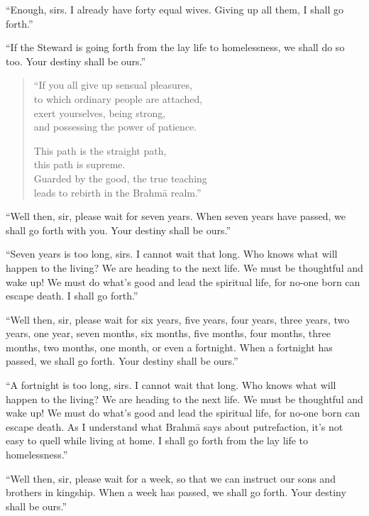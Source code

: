 \documentclass[12pt,openany]{book}%
\begin{document}
“Enough, sirs. I already have forty equal wives. Giving up all them, I shall go forth.” 

“If the Steward is going forth from the lay life to homelessness, we shall do so too. Your destiny shall be ours.” 

\begin{verse}%
“If you all give up sensual pleasures, \\
to which ordinary people are attached, \\
exert yourselves, being strong, \\
and possessing the power of patience. 

This path is the straight path, \\
this path is supreme. \\
Guarded by the good, the true teaching \\
leads to rebirth in the \textsanskrit{Brahmā} realm.” 

%
\end{verse}

“Well then, sir, please wait for seven years. When seven years have passed, we shall go forth with you. Your destiny shall be ours.” 

“Seven years is too long, sirs. I cannot wait that long. Who knows what will happen to the living? We are heading to the next life. We must be thoughtful and wake up! We must do what’s good and lead the spiritual life, for no-one born can escape death. I shall go forth.” 

“Well then, sir, please wait for six years, five years, four years, three years, two years, one year, seven months, six months, five months, four months, three months, two months, one month, or even a fortnight. When a fortnight has passed, we shall go forth. Your destiny shall be ours.” 

“A fortnight is too long, sirs. I cannot wait that long. Who knows what will happen to the living? We are heading to the next life. We must be thoughtful and wake up! We must do what’s good and lead the spiritual life, for no-one born can escape death. As I understand what \textsanskrit{Brahmā} says about putrefaction, it’s not easy to quell while living at home. I shall go forth from the lay life to homelessness.” 

“Well then, sir, please wait for a week, so that we can instruct our sons and brothers in kingship. When a week has passed, we shall go forth. Your destiny shall be ours.” 
\end{document}
